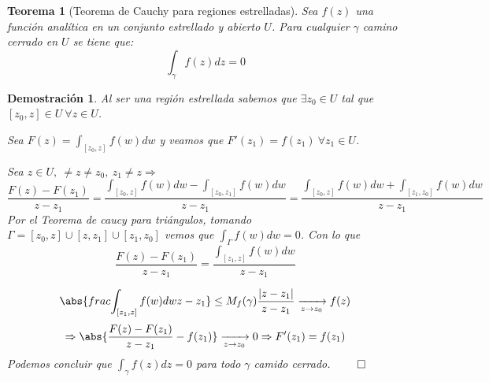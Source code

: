 \documentclass[10pt]{book}
\newtheorem{theorem}{Teorema}[chapter]
\newtheorem*{dem}{Demostración}
\begin{document}
\begin{theorem}[Teorema de Cauchy para regiones estrelladas]
Sea $f(z)$ una función analítica en un conjunto estrellado y abierto $U$. Para cualquier $\gamma$ camino cerrado en $U$ se tiene que:
$$
\int_{\gamma} f(z)dz = 0
$$
\end{theorem}

\begin{dem}
Al ser una región estrellada sabemos que $\exists z_0\in U$ tal que $[z_0,z]\in U\ \forall z \in U$.

Sea $F(z) = \int_{[z_0,z]}f(w)dw$ y veamos que $F'(z_1) = f(z_1)\ \forall z_1 \in U$.

Sea $z \in U,\ \neq z \neq z_0,\ z_1 \neq z \Rightarrow$
$$
\frac{F(z)-F(z_1)}{z-z_1} = \frac{\int_{[z_0,z]}f(w)dw- \int_{[z_0,z_1]}f(w)dw}{z-z_1} = \frac{\int_{[z_0,z]}f(w)dw+ \int_{[z_1,z_0]}f(w)dw}{z-z_1}
$$
Por el Teorema de caucy para triángulos, tomando $\Gamma = [z_0,z]\cup [z,z_1]\cup[z_1,z_0]$ vemos que $\int_\Gamma f(w)dw = 0$. Con lo que 
$$\frac{F(z)-F(z_1)}{z-z_1} = \frac{\int_{[z_1,z]}f(w)dw}{z-z_1}$$

$$
\abs{ frac{\int_{[z_1,z]}f(w)dw}{z-z_1}}\leq M_f(\gamma) \frac{|z-z_1|}{z-z_1} \xrightarrow[z\to z_0]{} f(z)
$$
$$
\Rightarrow \abs{\frac{F(z)-F(z_1)}{z-z_1}-f(z_1)}\xrightarrow[z\to z_0]{} 0 \Rightarrow F'(z_1) = f(z_1)
$$
Podemos concluir que $\int_\gamma f(z)dz=0$ para todo $\gamma$ camido cerrado. $\qed$
\end{dem}
\end{document}
